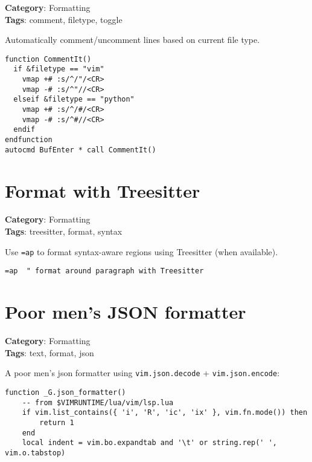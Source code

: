 {{{{{\textbf{Category}: Formatting\\ \textbf{Tags}: comment, filetype, toggle
\vspace{0.5cm}

Automatically comment/uncomment lines based on current file type.

\begin{Exa*}{}
\begin{Verbatim}[fontsize=\footnotesize, breaklines, breakanywhere]
function CommentIt()
  if &filetype == "vim"
    vmap +# :s/^/"/<CR>
    vmap -# :s/^"//<CR>
  elseif &filetype == "python"
    vmap +# :s/^/#/<CR>
    vmap -# :s/^#//<CR>
  endif
endfunction
autocmd BufEnter * call CommentIt()
\end{Verbatim}
\end{Exa*}

\section{Format with Treesitter}

\textbf{Category}: Formatting\\ \textbf{Tags}: treesitter, format, syntax
\vspace{0.5cm}

Use {\footnotesize \Verb§=ap§} to format syntax-aware regions using Treesitter (when available).

\begin{Exa*}{}
\begin{Verbatim}[fontsize=\footnotesize, breaklines, breakanywhere]
=ap  " format around paragraph with Treesitter
\end{Verbatim}
\end{Exa*}

\section{Poor men's JSON formatter}

\textbf{Category}: Formatting\\ \textbf{Tags}: text, format, json
\vspace{0.5cm}

A poor men's json formatter using {\footnotesize \Verb§vim.json.decode§} + {\footnotesize \Verb§vim.json.encode§}:

\begin{Exa*}{}
\begin{Verbatim}[fontsize=\footnotesize, breaklines, breakanywhere]
function _G.json_formatter()
	-- from $VIMRUNTIME/lua/vim/lsp.lua
	if vim.list_contains({ 'i', 'R', 'ic', 'ix' }, vim.fn.mode()) then
		return 1
	end
	local indent = vim.bo.expandtab and '\t' or string.rep(' ', vim.o.tabstop)


\end{Verbatim}
\end{Exa*}}}}}}
